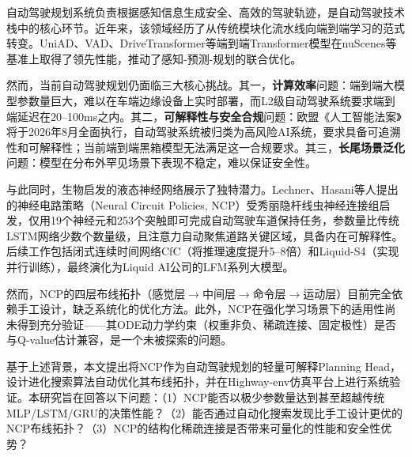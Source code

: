\xiaosi

自动驾驶规划系统负责根据感知信息生成安全、高效的驾驶轨迹，是自动驾驶技术栈中的核心环节。近年来，该领域经历了从传统模块化流水线向端到端学习的范式转变。UniAD\cite{hu2023uniad}、VAD\cite{jiang2023vad}、DriveTransformer\cite{drivetransformer2025}等端到端Transformer模型在nuScenes\cite{caesar2020nuscenes}等基准上取得了领先性能，推动了感知-预测-规划的联合优化。

然而，当前自动驾驶规划仍面临三大核心挑战。其一，\textbf{计算效率}问题：端到端大模型参数量巨大，难以在车端边缘设备上实时部署，而L2级自动驾驶系统要求端到端延迟在20--100ms之内。其二，\textbf{可解释性与安全合规}问题：欧盟《人工智能法案》将于2026年8月全面执行\cite{euaiact2025}，自动驾驶系统被归类为高风险AI系统，要求具备可追溯性和可解释性；当前端到端黑箱模型无法满足这一合规要求\cite{zablocki2022xad}。其三，\textbf{长尾场景泛化}问题：模型在分布外罕见场景下表现不稳定，难以保证安全性。

与此同时，生物启发的液态神经网络展示了独特潜力。Lechner、Hasani等人\cite{lechner2020ncp}提出的神经电路策略（Neural Circuit Policies, NCP）受秀丽隐杆线虫神经连接组\cite{white1986celegans}启发，仅用19个神经元和253个突触即可完成自动驾驶车道保持任务，参数量比传统LSTM网络少数个数量级，且注意力自动聚焦道路关键区域，具备内在可解释性。后续工作包括闭式连续时间网络CfC\cite{hasani2022cfc}（将推理速度提升5--8倍）和Liquid-S4\cite{hasani2023liquids4}（实现并行训练），最终演化为Liquid AI公司的LFM系列大模型\cite{lfm2tech2025}。

然而，NCP的四层布线拓扑（感觉层$\to$中间层$\to$命令层$\to$运动层）目前完全依赖手工设计，缺乏系统化的优化方法。此外，NCP在强化学习场景下的适用性尚未得到充分验证——其ODE动力学约束（权重非负、稀疏连接、固定极性）是否与Q-value估计兼容，是一个未被探索的问题。

基于上述背景，本文提出将NCP作为自动驾驶规划的轻量可解释Planning Head，设计进化搜索算法自动优化其布线拓扑，并在Highway-env\cite{leurent2018highway}仿真平台上进行系统验证。本研究旨在回答以下问题：（1）NCP能否以极少参数量达到甚至超越传统MLP/LSTM/GRU的决策性能？（2）能否通过自动化搜索发现比手工设计更优的NCP布线拓扑？（3）NCP的结构化稀疏连接是否带来可量化的性能和安全性优势？
